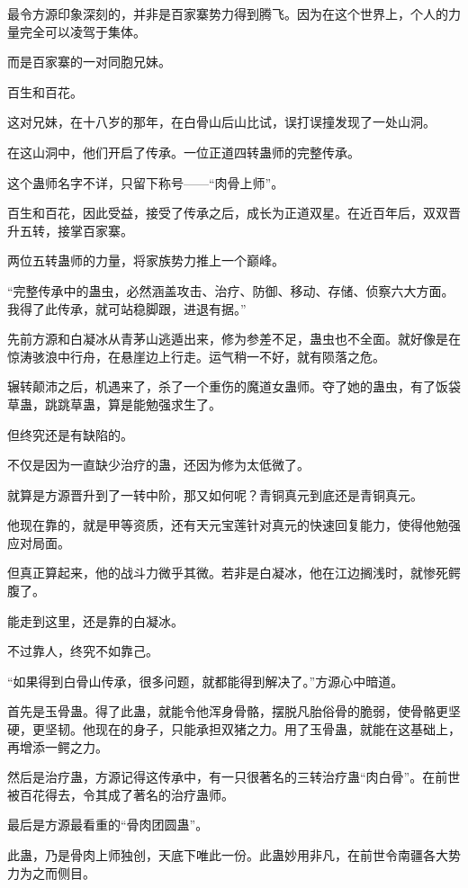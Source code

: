 \begin{this_body}
最令方源印象深刻的，并非是百家寨势力得到腾飞。因为在这个世界上，个人的力量完全可以凌驾于集体。

而是百家寨的一对同胞兄妹。

百生和百花。

这对兄妹，在十八岁的那年，在白骨山后山比试，误打误撞发现了一处山洞。

在这山洞中，他们开启了传承。一位正道四转蛊师的完整传承。

这个蛊师名字不详，只留下称号——“肉骨上师”。

百生和百花，因此受益，接受了传承之后，成长为正道双星。在近百年后，双双晋升五转，接掌百家寨。

两位五转蛊师的力量，将家族势力推上一个巅峰。

“完整传承中的蛊虫，必然涵盖攻击、治疗、防御、移动、存储、侦察六大方面。我得了此传承，就可站稳脚跟，进退有据。”

先前方源和白凝冰从青茅山逃遁出来，修为参差不足，蛊虫也不全面。就好像是在惊涛骇浪中行舟，在悬崖边上行走。运气稍一不好，就有陨落之危。

辗转颠沛之后，机遇来了，杀了一个重伤的魔道女蛊师。夺了她的蛊虫，有了饭袋草蛊，跳跳草蛊，算是能勉强求生了。

但终究还是有缺陷的。

不仅是因为一直缺少治疗的蛊，还因为修为太低微了。

就算是方源晋升到了一转中阶，那又如何呢？青铜真元到底还是青铜真元。

他现在靠的，就是甲等资质，还有天元宝莲针对真元的快速回复能力，使得他勉强应对局面。

但真正算起来，他的战斗力微乎其微。若非是白凝冰，他在江边搁浅时，就惨死鳄腹了。

能走到这里，还是靠的白凝冰。

不过靠人，终究不如靠己。

“如果得到白骨山传承，很多问题，就都能得到解决了。”方源心中暗道。

首先是玉骨蛊。得了此蛊，就能令他浑身骨骼，摆脱凡胎俗骨的脆弱，使骨骼更坚硬，更坚韧。他现在的身子，只能承担双猪之力。用了玉骨蛊，就能在这基础上，再增添一鳄之力。

然后是治疗蛊，方源记得这传承中，有一只很著名的三转治疗蛊“肉白骨”。在前世被百花得去，令其成了著名的治疗蛊师。

最后是方源最看重的“骨肉团圆蛊”。

此蛊，乃是骨肉上师独创，天底下唯此一份。此蛊妙用非凡，在前世令南疆各大势力为之而侧目。


\end{this_body}
